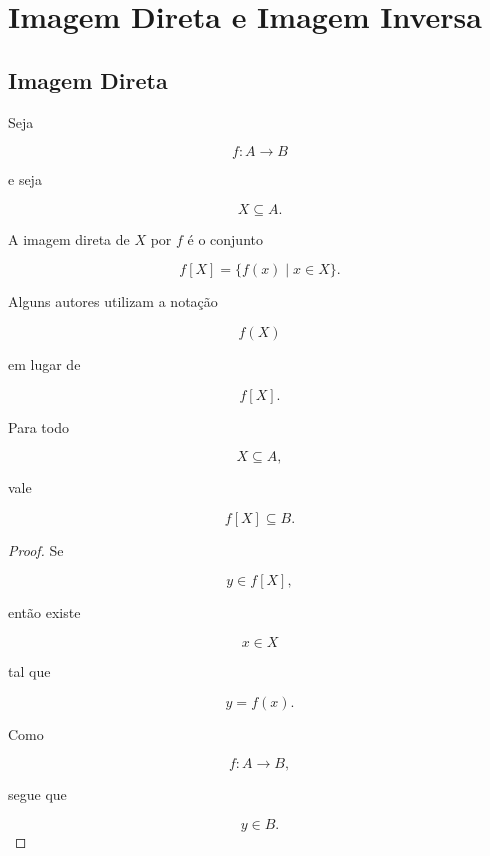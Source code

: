 \documentclass[../../main]{subfiles}
\begin{document}
\section{Imagem Direta e Imagem Inversa}
\label{sec:matematica:funcoes:imagem-direta-e-inversa}

\subsection{Imagem Direta}

\begin{defn}
	\label{def:matematica:funcoes:imagem-direta-e-inversa:imagem-direta}

	Seja

	\[
		f:A\to B
	\]

	e seja

	\[
		X\subseteq A.
	\]

	A imagem direta de \(X\) por \(f\) é o conjunto

	\[
		f[X]
		=
		\{
		f(x)
		\mid
		x\in X
		\}.
	\]

\end{defn}

\begin{obs}

	Alguns autores utilizam a notação

	\[
		f(X)
	\]

	em lugar de

	\[
		f[X].
	\]

\end{obs}

\begin{prop}
	\label{prop:matematica:funcoes:imagem-direta-e-inversa:imagem-direta-subconjunto}

	Para todo

	\[
		X\subseteq A,
	\]

	vale

	\[
		f[X]
		\subseteq
		B.
	\]

\end{prop}

\begin{proof}

	Se

	\[
		y\in f[X],
	\]

	então existe

	\[
		x\in X
	\]

	tal que

	\[
		y=f(x).
	\]

	Como

	\[
		f:A\to B,
	\]

	segue que

	\[
		y\in B.
	\]

\end{proof}
\end{document}
